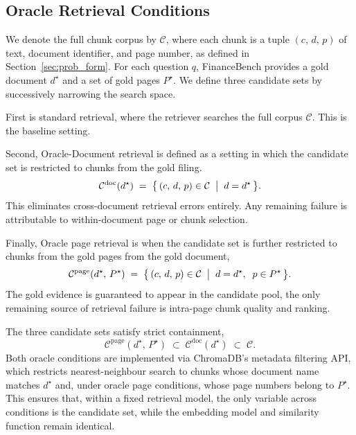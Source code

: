 \documentclass[12pt,twoside,maitrise]{dms}
\theoremstyle{definition}
\numberwithin{equation}{section}
\numberwithin{table}{chapter}
\numberwithin{figure}{chapter}
\begin{document}
\subsection{Oracle Retrieval Conditions}
\label{sec:oracle_conditions}

We denote the full chunk corpus by $\mathcal{C}$, where each chunk is a tuple
$(c,\,d,\,p)$ of text, document identifier, and page number, as defined in
Section~\ref{sec:prob_form}.  For each question $q$, FinanceBench provides a gold
document $d^{\star}$ and a set of gold pages $P^{\star}$.  We define three candidate
sets by successively narrowing the search space.

First is standard retrieval, where the retriever searches the full corpus $\mathcal{C}$.  This is the baseline setting.

Second, Oracle-Document retrieval is defined as a setting in which the candidate set is restricted to chunks from the gold filing.
\begin{equation}
  \mathcal{C}^{\mathrm{doc}}(d^{\star})
    \;=\; \bigl\{\,(c,\,d,\,p)\in\mathcal{C} \;\bigm|\; d = d^{\star}\,\bigr\}.
  \label{eq:oracle_doc}
\end{equation}
This eliminates cross-document retrieval errors entirely.  Any remaining failure is
attributable to within-document page or chunk selection.

Finally, Oracle page retrieval is when the candidate set is further restricted to chunks from the gold pages from the gold document,
\begin{equation}
  \mathcal{C}^{\mathrm{page}}(d^{\star},\,P^{\star})
    \;=\; \bigl\{\,(c,\,d,\,p)\in\mathcal{C} \;\bigm|\; d = d^{\star},\;\;
                  p \in P^{\star}\,\bigr\}.
  \label{eq:oracle_page}
\end{equation}
The gold evidence is guaranteed to appear in the candidate pool, the only remaining
source of retrieval failure is intra-page chunk quality and ranking.

The three candidate sets satisfy strict containment,
\begin{equation}
  \mathcal{C}^{\mathrm{page}}(d^{\star},\,P^{\star})
    \;\subset\;
  \mathcal{C}^{\mathrm{doc}}(d^{\star})
    \;\subset\;
  \mathcal{C}.
  \label{eq:containment}
\end{equation}
Both oracle conditions are implemented via ChromaDB's metadata filtering API, which
restricts nearest-neighbour search to chunks whose document name matches
$d^{\star}$ and, under oracle page conditions, whose page numbers belong to
$P^{\star}$.  This ensures that, within a fixed retrieval model, the only variable across conditions is the candidate set, while the embedding model and similarity function remain identical.
\end{document}
